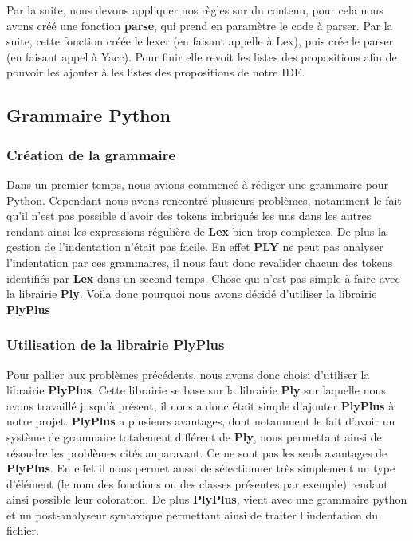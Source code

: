 \documentclass[a4paper,12pt]{article}
\begin{document}
				Par la suite, nous devons appliquer nos règles sur du contenu, pour cela nous avons créé une fonction \textbf{parse}, qui prend en paramètre le code à parser. Par la suite, cette fonction créée le lexer (en faisant appelle à Lex), puis crée le parser (en faisant appel à Yacc). Pour finir elle revoit les listes des propositions afin de pouvoir les ajouter à les listes des propositions de notre IDE.
	
	\subsection{Grammaire Python}

		\subsubsection{Création de la grammaire}

			Dans un premier temps, nous avions commencé à rédiger une grammaire pour Python. Cependant nous avons rencontré plusieurs problèmes, notamment le fait qu'il n'est pas possible d'avoir des tokens imbriqués les uns dans les autres rendant ainsi les expressions régulière de \textbf{Lex} bien trop complexes. De plus la gestion de l'indentation n'était pas facile. En effet \textbf{PLY} ne peut pas analyser l'indentation par ces grammaires, il nous faut donc revalider chacun des tokens identifiés par \textbf{Lex} dans un second temps. Chose qui n'est pas simple à faire avec la librairie \textbf{Ply}. Voila donc pourquoi nous avons décidé d'utiliser la librairie \textbf{PlyPlus}

		\subsubsection{Utilisation de la librairie PlyPlus}

			Pour pallier aux problèmes précédents, nous avons donc choisi d'utiliser la librairie \textbf{PlyPlus}. Cette librairie se base sur la librairie \textbf{Ply} sur laquelle nous avons travaillé jusqu'à présent, il nous a donc était simple d'ajouter \textbf{PlyPlus} à notre projet. \textbf{PlyPlus} a plusieurs avantages, dont notamment le fait d'avoir un système de grammaire totalement différent de \textbf{Ply}, nous permettant ainsi de résoudre les problèmes cités auparavant. Ce ne sont pas les seuls avantages de \textbf{PlyPlus}. En effet il nous permet aussi de sélectionner très simplement un type d'élément (le nom des fonctions ou des classes présentes par exemple) rendant ainsi possible leur coloration. De plus \textbf{PlyPlus}, vient avec une grammaire python et un post-analyseur syntaxique permettant ainsi de traiter l'indentation du fichier. \\
			
\end{document}
